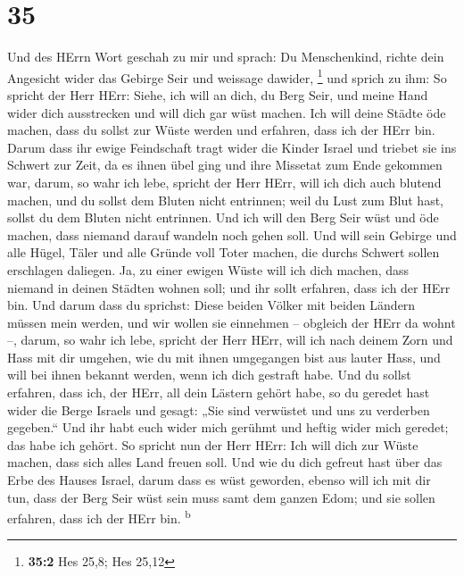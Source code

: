 \hypertarget{section-34}{%
\section{35}\label{section-34}}

 Und des HErrn Wort geschah zu mir und sprach:
 Du Menschenkind, richte dein Angesicht wider das Gebirge
Seir und weissage dawider, \footnote{\textbf{35:2} Hes 25,8; Hes 25,12}
 und sprich zu ihm: So spricht der Herr HErr: Siehe, ich
will an dich, du Berg Seir, und meine Hand wider dich ausstrecken und
will dich gar wüst machen.  Ich will deine Städte öde
machen, dass du sollst zur Wüste werden und erfahren, dass ich der HErr
bin.  Darum dass ihr ewige Feindschaft tragt wider die
Kinder Israel und triebet sie ins Schwert zur Zeit, da es ihnen übel
ging und ihre Missetat zum Ende gekommen war,  darum, so
wahr ich lebe, spricht der Herr HErr, will ich dich auch blutend machen,
und du sollst dem Bluten nicht entrinnen; weil du Lust zum Blut hast,
sollst du dem Bluten nicht entrinnen.  Und ich will den
Berg Seir wüst und öde machen, dass niemand darauf wandeln noch gehen
soll.  Und will sein Gebirge und alle Hügel, Täler und
alle Gründe voll Toter machen, die durchs Schwert sollen erschlagen
daliegen.  Ja, zu einer ewigen Wüste will ich dich machen,
dass niemand in deinen Städten wohnen soll; und ihr sollt erfahren, dass
ich der HErr bin.  Und darum dass du sprichst: Diese
beiden Völker mit beiden Ländern müssen mein werden, und wir wollen sie
einnehmen -- obgleich der HErr da wohnt --,  darum, so
wahr ich lebe, spricht der Herr HErr, will ich nach deinem Zorn und Hass
mit dir umgehen, wie du mit ihnen umgegangen bist aus lauter Hass, und
will bei ihnen bekannt werden, wenn ich dich gestraft habe.
 Und du sollst erfahren, dass ich, der HErr, all dein
Lästern gehört habe, so du geredet hast wider die Berge Israels und
gesagt: „Sie sind verwüstet und uns zu verderben gegeben.``
 Und ihr habt euch wider mich gerühmt und heftig wider
mich geredet; das habe ich gehört.  So spricht nun der
Herr HErr: Ich will dich zur Wüste machen, dass sich alles Land freuen
soll.  Und wie du dich gefreut hast über das Erbe des
Hauses Israel, darum dass es wüst geworden, ebenso will ich mit dir tun,
dass der Berg Seir wüst sein muss samt dem ganzen Edom; und sie sollen
erfahren, dass ich der HErr bin. \textsuperscript{b}

